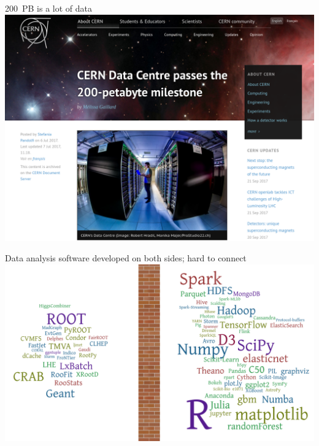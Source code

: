 \documentclass[aspectratio=169]{beamer}
\begin{document}
\begin{frame}{{200~PB is a lot of data}}
\vspace{0.35 cm}
\includegraphics[width=0.73\linewidth]{cern-200pb.png}

\vspace{-4.8 cm}
\end{frame}

\begin{frame}{Data analysis software developed on both sides; hard to connect}
\vspace{0.17 cm}
\includegraphics[width=\linewidth]{separation-2.png}
\end{frame}
\end{document}
